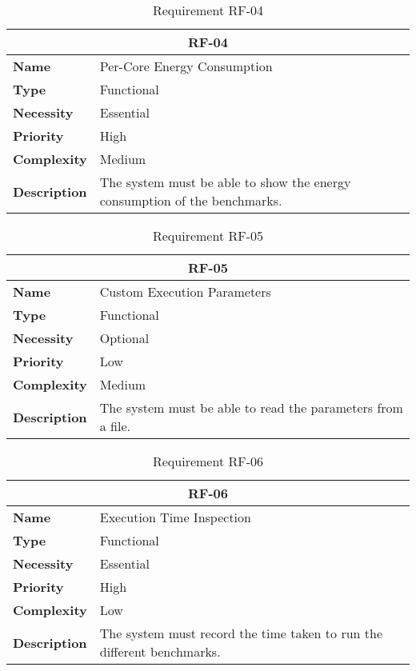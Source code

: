 \begin{table}[H]
    \centering
    \begin{tabular}{l p{10cm}}
        \toprule
        \multicolumn{2}{c}{\textbf{RF-04}} \\
        \toprule
        \textbf{Name}               & Per-Core Energy Consumption \\
        \textbf{Type}               & Functional \\
        \textbf{Necessity}          & Essential \\
        \textbf{Priority}           & High \\
        \textbf{Complexity}         & Medium \\
        \textbf{Description}        & The system must be able to show the energy consumption of the benchmarks. \\
        \bottomrule
    \end{tabular}
\caption{Requirement RF-04}\label{tab:rf-04}
\end{table}

\begin{table}[H]
    \centering
    \begin{tabular}{l p{10cm}}
        \toprule
        \multicolumn{2}{c}{\textbf{RF-05}} \\
        \toprule
        \textbf{Name}               & Custom Execution Parameters \\
        \textbf{Type}               & Functional \\
        \textbf{Necessity}          & Optional \\
        \textbf{Priority}           & Low \\
        \textbf{Complexity}         & Medium \\
        \textbf{Description}        & The system must be able to read the parameters from a file. \\
        \bottomrule
    \end{tabular}
\caption{Requirement RF-05}\label{tab:rf-05}
\end{table}

\begin{table}[H]
    \centering
    \begin{tabular}{l p{10cm}}
        \toprule
        \multicolumn{2}{c}{\textbf{RF-06}} \\
        \toprule
        \textbf{Name}               & Execution Time Inspection \\
        \textbf{Type}               & Functional \\
        \textbf{Necessity}          & Essential \\
        \textbf{Priority}           & High \\
        \textbf{Complexity}         & Low \\
        \textbf{Description}        & The system must record the time taken to run the different benchmarks. \\
        \bottomrule
    \end{tabular}
\caption{Requirement RF-06}\label{tab:rf-06}
\end{table}


